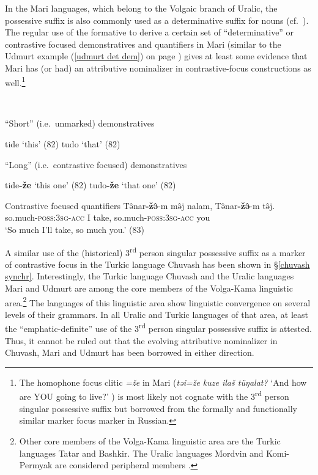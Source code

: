 In the Mari languages, which belong to the Volgaic branch of Uralic, the possessive suffix is also commonly used as a determinative suffix for nouns (cf.~\citealt[75–76]{alhoniemi1993}). The regular use of the formative to derive a certain set of “determinative” or contrastive focused demonstratives and quantifiers in Mari (similar to the Udmurt example (\ref{udmurt det dem}) on page \pageref{udmurt det dem}) gives at least some evidence that Mari has (or had) an attributive nominalizer in contrastive-focus constructions as well.\footnote{The homophone focus clitic \textit{=že} in Mari (\textit{təi=že kuze ilaš tüŋalat?} ‘And how are YOU going to live?’ \citealt[80]{alhoniemi1993}) is most likely not cognate with the 3\textsuperscript{rd} person singular possessive suffix but borrowed from the formally and functionally similar marker focus marker in Russian.}%
\begin{exe}
\ex {}\\%
\begin{xlist}
\ex “Short” (i.e.~unmarked) demonstratives 
\begin{xlist}
\ex tide ‘this’ (82)
\ex tudo ‘that’ (82)
\end{xlist}
\ex “Long” (i.e.~contrastive focused) demonstratives 
\begin{xlist}
\ex tide\textbf{-že} ‘this one’ (82)
\ex tudo\textbf{-že} ‘that one’ (82)
\end{xlist}
\ex Contrastive focused quantifiers
\gll	Tə̂nar\textbf{-žə̂}-m mə̂j nalam, Tə̂nar\textbf{-žə̂}-m tə̂j.\\
	so.much-\textsc{poss:3sg}-\textsc{acc} I take, so.much-\textsc{poss:3sg}-\textsc{acc} you\\
\glt	‘So much I'll take, so much you.’ (83)
\end{xlist}
\end{exe}
A similar use of the (historical) 3\textsuperscript{rd} person singular possessive suffix as a marker of contrastive focus in the Turkic language Chuvash has been shown in \S\ref{chuvash synchr}. Interestingly, the Turkic language Chuvash and the Uralic languages Mari and Udmurt are among the core members of the Volga-Kama linguistic area.\footnote{Other core members of the Volga-Kama linguistic area are the Turkic languages Tatar and Bashkir. The Uralic languages Mordvin and Komi-Permyak are considered peripheral members \citep{helimski2005}.} The languages of this linguistic area show linguistic convergence on several levels of their grammars. In all Uralic and Turkic languages of that area, at least the “emphatic-definite” use of the 3\textsuperscript{rd} person singular possessive suffix is attested. Thus, it cannot be ruled out that the evolving attributive nominalizer in Chuvash, Mari and Udmurt has been borrowed in either direction.%

